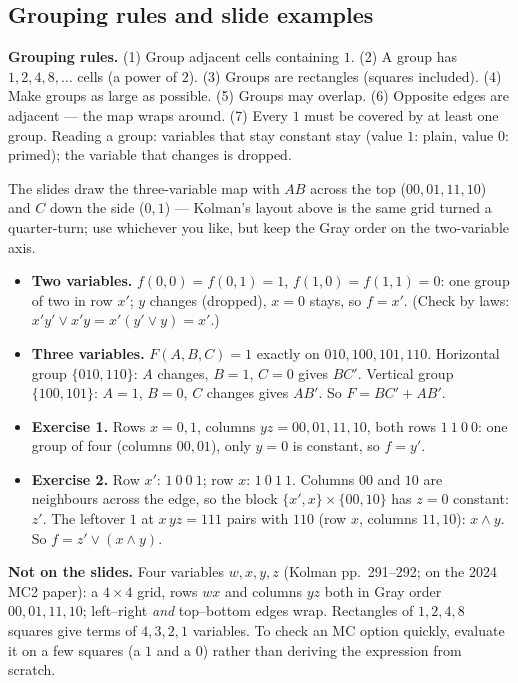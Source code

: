 \documentclass{fkt-notes}
\newcommand{\notslides}[1]{\par\noindent\textbf{Not on the slides.} #1\par}
\theoremstyle{definition}
\begin{document}
\subsection{Grouping rules and slide examples}
%
\begin{rulepar}
  \textbf{Grouping rules.} (1) Group adjacent cells containing $1$.
  (2) A group has $1,2,4,8,\dots$ cells (a power of $2$).
  (3) Groups are rectangles (squares included).
  (4) Make groups as large as possible.
  (5) Groups may overlap.
  (6) Opposite edges are adjacent --- the map wraps around.
  (7) Every $1$ must be covered by at least one group.
  Reading a group: variables that stay constant stay (value $1$: plain,
  value $0$: primed); the variable that changes is dropped.
\end{rulepar}
The slides draw the three-variable map with $AB$ across the top
($00,01,11,10$) and $C$ down the side ($0,1$) --- Kolman's layout above
is the same grid turned a quarter-turn; use whichever you like, but keep the
Gray order on the two-variable axis.
\begin{itemize}[nosep]
  \item \textbf{Two variables.} $f(0,0)=f(0,1)=1$, $f(1,0)=f(1,1)=0$: one
        group of two in row $x'$; $y$ changes (dropped), $x=0$ stays, so
        $f=x'$. (Check by laws: $x'y'\vee x'y=x'(y'\vee y)=x'$.)
  \item \textbf{Three variables.} $F(A,B,C)=1$ exactly on $010,100,101,110$.
        Horizontal group $\{010,110\}$: $A$ changes, $B=1$, $C=0$ gives
        $BC'$. Vertical group $\{100,101\}$: $A=1$, $B=0$, $C$ changes gives
        $AB'$. So $F=BC'+AB'$.
  \item \textbf{Exercise 1.} Rows $x=0,1$, columns $yz=00,01,11,10$,
        both rows $1\ 1\ 0\ 0$: one group of four (columns $00,01$), only
        $y=0$ is constant, so $f=y'$.
  \item \textbf{Exercise 2.} Row $x'$: $1\ 0\ 0\ 1$; row $x$: $1\ 0\ 1\ 1$.
        Columns $00$ and $10$ are neighbours across the edge, so the block
        $\{x',x\}\times\{00,10\}$ has $z=0$ constant: $z'$. The leftover
        $1$ at $x\,yz=111$ pairs with $110$ (row $x$, columns $11,10$):
        $x\wedge y$. So $f=z'\vee(x\wedge y)$.
\end{itemize}

\notslides{Four variables $w,x,y,z$ (Kolman pp.~291--292; on the 2024 MC2
  paper): a $4\times4$ grid, rows $wx$ and columns $yz$ both in Gray
  order $00,01,11,10$; left--right \emph{and} top--bottom edges wrap.
  Rectangles of $1,2,4,8$ squares give terms of $4,3,2,1$ variables.
  To check an MC option quickly, evaluate it on a few squares (a $1$ and
  a $0$) rather than deriving the expression from scratch.}
\end{document}
